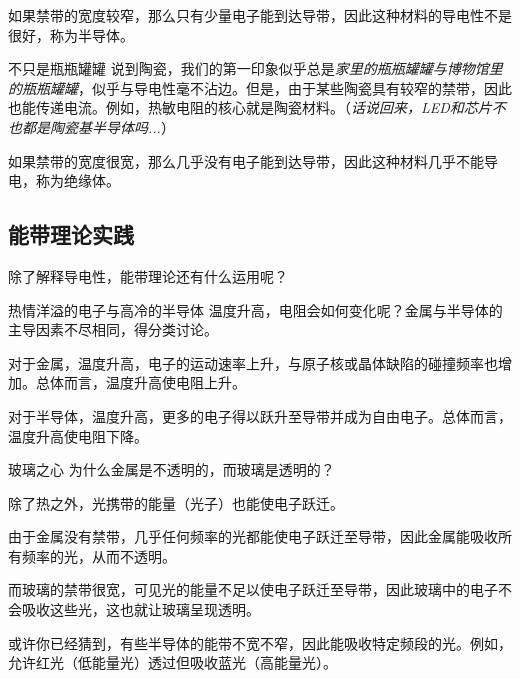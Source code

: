 如果禁带的宽度较窄，那么只有少量电子能到达导带，因此这种材料的导电性不是很好，称为半导体。

\begin{example}{不只是瓶瓶罐罐}
说到陶瓷，我们的第一印象似乎总是\textsl{家里的瓶瓶罐罐与博物馆里的瓶瓶罐罐}，似乎与导电性毫不沾边。但是，由于某些陶瓷具有较窄的禁带，因此也能传递电流。例如，热敏电阻的核心就是陶瓷材料。（\textsl{话说回来，LED和芯片不也都是陶瓷基半导体吗...}）
\end{example}

如果禁带的宽度很宽，那么几乎没有电子能到达导带，因此这种材料几乎不能导电，称为绝缘体。

\subsection{能带理论实践}
除了解释导电性，能带理论还有什么运用呢？

\begin{example}{热情洋溢的电子与高冷的半导体}
温度升高，电阻会如何变化呢？金属与半导体的主导因素不尽相同，得分类讨论。

对于金属，温度升高，电子的运动速率上升，与原子核或晶体缺陷的碰撞频率也增加。总体而言，温度升高使电阻上升。

对于半导体，温度升高，更多的电子得以跃升至导带并成为自由电子。总体而言，温度升高使电阻下降。
\end{example}

\begin{example}{玻璃之心}
为什么金属是不透明的，而玻璃是透明的？

除了热之外，光携带的能量（光子）也能使电子跃迁。

由于金属没有禁带，几乎任何频率的光都能使电子跃迁至导带，因此金属能吸收所有频率的光，从而不透明。

而玻璃的禁带很宽，可见光的能量不足以使电子跃迁至导带，因此玻璃中的电子不会吸收这些光，这也就让玻璃呈现透明。

或许你已经猜到，有些半导体的能带不宽不窄，因此能吸收特定频段的光。例如，允许红光（低能量光）透过但吸收蓝光（高能量光）。
\end{example}
